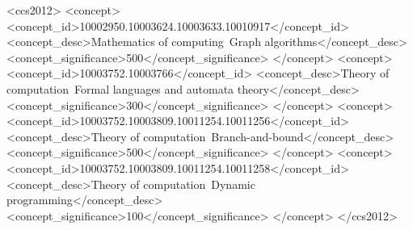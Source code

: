 \documentclass[sigconf]{acmart}
\begin{document}
\begin{CCSXML}
<ccs2012>
   <concept>
       <concept_id>10002950.10003624.10003633.10010917</concept_id>
       <concept_desc>Mathematics of computing~Graph algorithms</concept_desc>
       <concept_significance>500</concept_significance>
       </concept>
   <concept>
       <concept_id>10003752.10003766</concept_id>
       <concept_desc>Theory of computation~Formal languages and automata theory</concept_desc>
       <concept_significance>300</concept_significance>
       </concept>
   <concept>
       <concept_id>10003752.10003809.10011254.10011256</concept_id>
       <concept_desc>Theory of computation~Branch-and-bound</concept_desc>
       <concept_significance>500</concept_significance>
       </concept>
   <concept>
       <concept_id>10003752.10003809.10011254.10011258</concept_id>
       <concept_desc>Theory of computation~Dynamic programming</concept_desc>
       <concept_significance>100</concept_significance>
       </concept>
 </ccs2012>
\end{CCSXML}



\maketitle
\end{document}
